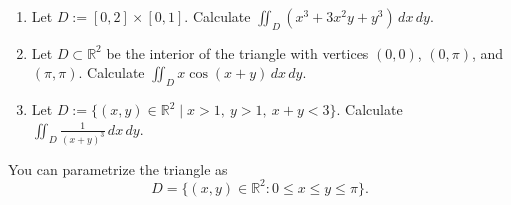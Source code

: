\begin{exercise}
\label{ex:curve_length_polar_and_vector_integral}
\begin{enumerate}[label=\textbf{(\alph*)}]
  \item Let $D := [0,2]\times[0,1]$. Calculate $\displaystyle\iint_D (x^3+3x^2y+y^3)\,dx\,dy$.
  \item Let $D \subset \mathbb{R}^2$ be the interior of the triangle with vertices $(0,0)$,
    $(0,\pi)$, and $(\pi,\pi)$. Calculate $\displaystyle\iint_D x\cos(x+y)\,dx\,dy$.
  \item Let $D := \{(x,y)\in\mathbb{R}^2 \mid x>1,\ y>1,\ x+y<3\}$. Calculate
    $\displaystyle\iint_D \frac{1}{(x+y)^3}\,dx\,dy$.
\end{enumerate}

\begin{exercisehint}
You can parametrize the triangle as
\[D = \{(x,y)\in\mathbb{R}^2 : 0 \leq x \leq y \leq \pi\}.\]
\end{exercisehint}
\end{exercise}


